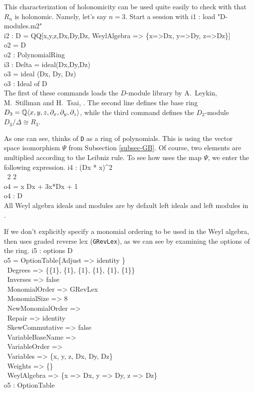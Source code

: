 This characterization of holonomicity can be used quite easily to
check with \Mtwo that $R_n$ is holonomic. Namely, let's say $n=3$. 
Start a \Mtwo session with
\beginOutput
i1 : load "D-modules.m2"\\
\endOutput
\beginOutput
i2 : D = QQ[x,y,z,Dx,Dy,Dz, WeylAlgebra => \{x=>Dx, y=>Dy, z=>Dz\}]\\
\emptyLine
o2 = D\\
\emptyLine
o2 : PolynomialRing\\
\endOutput
\beginOutput
i3 : Delta = ideal(Dx,Dy,Dz)\\
\emptyLine
o3 = ideal (Dx, Dy, Dz)\\
\emptyLine
o3 : Ideal of D\\
\endOutput
The first of these commands loads the $D$-module library 
by A.\ Leykin, M.\ Stillman  and H.\ Tsai, \cite{DM:M2D}. 
The second line defines the
base ring $D_3={\mathbb Q}\langle x,y,z,\partial_x,\partial_y,\partial_z\rangle$, 
while the third command defines the $D_3$-module $D_3/\Delta\cong
R_3$.

As one can see, \Mtwo thinks of {\tt D} as a ring of polynomials. This is
using the vector space isomorphism $\Psi$ from Subsection
\ref{subsec-GB}. Of course, two elements are multiplied according to
the Leibniz rule. 
To see how \Mtwo uses the map $\Psi$, we enter the following expression.
\beginOutput
i4 : (Dx * x)^2\\
\emptyLine
\      2  2\\
o4 = x Dx  + 3x*Dx + 1\\
\emptyLine
o4 : D\\
\endOutput
All Weyl algebra ideals and modules 
are by default left
ideals and left modules in \Mtwo. 

If we don't explicitly specify a monomial ordering to be used in the Weyl
algebra, then \Mtwo uses graded reverse lex ({\tt GRevLex}), as we can see by
examining the options of the ring.
\beginOutput
i5 : options D\\
\emptyLine
o5 = OptionTable\{Adjust => identity                        \}\\
\                 Degrees => \{\{1\}, \{1\}, \{1\}, \{1\}, \{1\}, \{1\}\}\\
\                 Inverses => false\\
\                 MonomialOrder => GRevLex\\
\                 MonomialSize => 8\\
\                 NewMonomialOrder => \\
\                 Repair => identity\\
\                 SkewCommutative => false\\
\                 VariableBaseName => \\
\                 VariableOrder => \\
\                 Variables => \{x, y, z, Dx, Dy, Dz\}\\
\                 Weights => \{\}\\
\                 WeylAlgebra => \{x => Dx, y => Dy, z => Dz\}\\
\emptyLine
o5 : OptionTable\\
\endOutput

